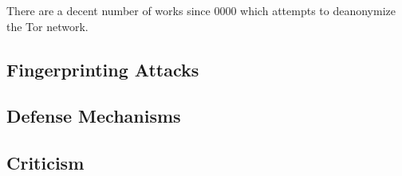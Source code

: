 
There are a decent number of works since 0000 which attempts to deanonymize the Tor network.

\subsection{Fingerprinting Attacks}


\subsection{Defense Mechanisms}


\subsection{Criticism}

